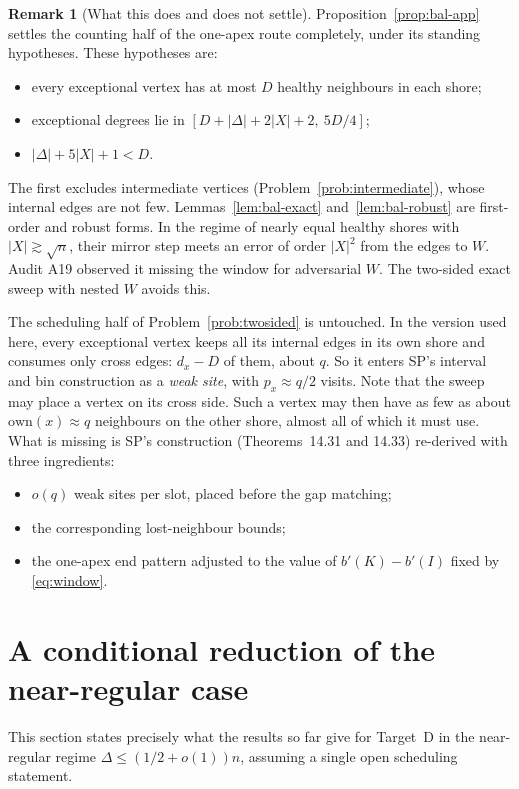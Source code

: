 \documentclass[11pt]{article}
\theoremstyle{definition}
\newtheorem{remark}[theorem]{Remark}
\newcommand{\own}{\mathrm{own}}
\begin{document}
\begin{remark}[What this does and does not settle]\label{rem:bal-scope}
Proposition~\ref{prop:bal-app} settles the counting half of the one-apex route completely, under its standing hypotheses. These hypotheses are:
\begin{itemize}[nosep]
\item every exceptional vertex has at most $D$ healthy neighbours in each shore;
\item exceptional degrees lie in $[D+|\Delta|+2|X|+2,\ 5D/4]$;
\item $|\Delta|+5|X|+1<D$.
\end{itemize}
The first excludes intermediate vertices (Problem~\ref{prob:intermediate}), whose internal edges are not few. Lemmas~\ref{lem:bal-exact} and~\ref{lem:bal-robust} are first-order and robust forms. In the regime of nearly equal healthy shores with $|X|\gtrsim\sqrt n$, their mirror step meets an error of order $|X|^2$ from the edges to $W$. Audit A19 observed it missing the window for adversarial $W$. The two-sided exact sweep with nested $W$ avoids this.

The scheduling half of Problem~\ref{prob:twosided} is untouched. In the version used here, every exceptional vertex keeps all its internal edges in its own shore and consumes only cross edges: $d_x-D$ of them, about $q$. So it enters SP's interval and bin construction as a \emph{weak site}, with $p_x\approx q/2$ visits. Note that the sweep may place a vertex on its cross side. Such a vertex may then have as few as about $\own(x)\approx q$ neighbours on the other shore, almost all of which it must use. What is missing is SP's construction (Theorems~14.31 and 14.33) re-derived with three ingredients:
\begin{itemize}[nosep]
\item $o(q)$ weak sites per slot, placed before the gap matching;
\item the corresponding lost-neighbour bounds;
\item the one-apex end pattern adjusted to the value of $b'(K)-b'(I)$ fixed by \eqref{eq:window}.
\end{itemize}
\end{remark}

\section{A conditional reduction of the near-regular case}\label{sec:conditional}

This section states precisely what the results so far give for Target~D in the near-regular regime $\Delta\le(1/2+o(1))n$, assuming a single open scheduling statement.
\end{document}
